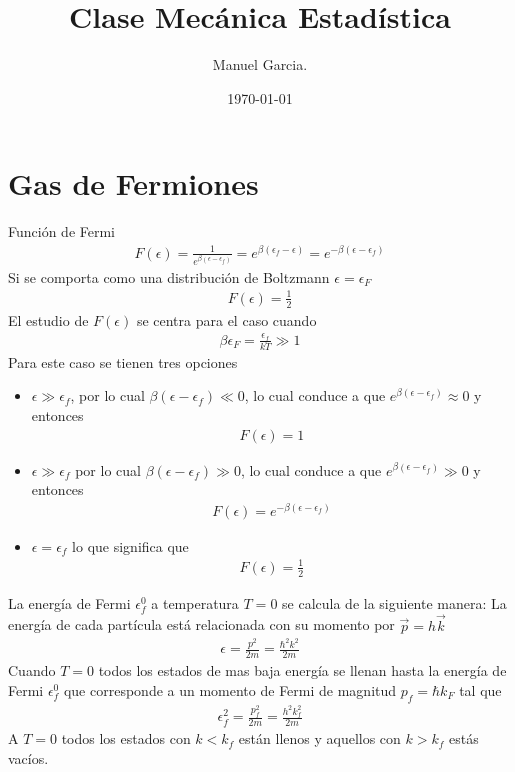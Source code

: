 \documentclass{article}
\title{Clase Mecánica Estadística }
\author{Manuel Garcia.}
\date{\today}
\begin{document}
\maketitle

\section{Gas de Fermiones }
Función de Fermi 
\begin{gather*}
  F(\epsilon) = \frac{1}{e ^ {\beta (\epsilon-\epsilon_f)}} = e ^ {\beta(\epsilon_f - \epsilon)} = e ^ {-\beta(\epsilon- \epsilon_f )}
\end{gather*}
Si se comporta como una distribución de Boltzmann $ \epsilon = \epsilon_F  $
\begin{gather*}
  F(\epsilon) = \frac{1}{2} 
\end{gather*}
El estudio de $ F(\epsilon) $ se centra para el caso cuando 
\begin{gather*}
  \beta\epsilon_F = \frac{\epsilon_f }{k T } \gg 1
\end{gather*}
Para este caso se tienen tres opciones 
\begin{itemize}
  \item $ \epsilon \gg \epsilon_f  $, por lo cual $ \beta(\epsilon - \epsilon_f ) \ll 0  $, lo cual conduce a que $  e ^ {\beta(\epsilon - \epsilon_f )}\approx 0  $ y entonces 
    \begin{gather*}
       F(\epsilon) = 1 
    \end{gather*}
  \item $ \epsilon \gg \epsilon_f  $ por lo cual $ \beta(\epsilon - \epsilon_f ) \gg 0  $, lo cual conduce a que $  e ^ {\beta(\epsilon - \epsilon_f )}\gg 0  $ y entonces 
    \begin{gather*}
      F(\epsilon ) = e ^ {-\beta(\epsilon- \epsilon_f )}
    \end{gather*}
  \item $ \epsilon = \epsilon_f  $ lo que significa que 
    \begin{gather*}
      F(\epsilon) = \frac{1}{2} 
    \end{gather*}
\end{itemize}
La energía de Fermi $ \epsilon_f^0  $ a temperatura $ T = 0  $ se calcula de la siguiente manera: 
La energía de cada partícula está relacionada con su momento por $ \vec p = h \vec k  $ 
\begin{gather*}
  \epsilon = \frac{p^2 }{2m } = \frac{\hbar^2 k ^2 }{2m }  
\end{gather*}
Cuando $ T = 0  $ todos los estados de mas baja energía se llenan hasta la energía de Fermi $ \epsilon_f^0  $ que corresponde a un momento de Fermi de magnitud $ p_f = \hbar k_F $ tal que 
\begin{gather*}
  \epsilon_f^2 = \frac{p_f^2 }{2m } = \frac{h^2 k_f^2 }{2m } 
\end{gather*}
A $ T = 0  $ todos los estados con $ k <k_f  $ están llenos y aquellos con $ k > k_f  $ estás vacíos. 
\end{document}
